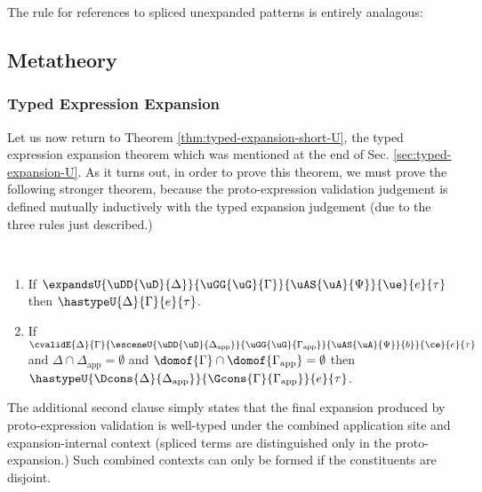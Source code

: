 \documentclass[acmsmall,10pt,review,anonymous]{acmart}\settopmatter{printfolios=true}
\begin{document}
The rule for references to spliced unexpanded patterns is entirely analagous:
\begin{mathpar}
\end{mathpar}

\subsection{Metatheory}\label{sec:s-metatheory}
\subsubsection{Typed Expression Expansion} Let us now return to Theorem \ref{thm:typed-expansion-short-U}, the typed expression expansion theorem which was mentioned at the end of Sec. \ref{sec:typed-expansion-U}. As it turns out, in order to prove this theorem, we must  prove the following stronger theorem, because the proto-expression validation judgement is defined mutually inductively with the typed expansion judgement (due to the three rules just described.)

\begin{theorem} ~
\begin{enumerate}[nolistsep]
\item If $\expandsU{\uDD{\uD}{\Delta}}{\uGG{\uG}{\Gamma}}{\uAS{\uA}{\Psi}}{\ue}{e}{\tau}$ then $\hastypeU{\Delta}{\Gamma}{e}{\tau}$.
\item If $\cvalidE{\Delta}{\Gamma}{\esceneU{\uDD{\uD}{\Delta_\text{app}}}{\uGG{\uG}{\Gamma_\text{app}}}{\uAS{\uA}{\Psi}}{b}}{\ce}{e}{\tau}$ and $\Delta \cap \Delta_\text{app} = \emptyset$ and $\domof{\Gamma} \cap \domof{\Gamma_\text{app}} = \emptyset$ then $\hastypeU{\Dcons{\Delta}{\Delta_\text{app}}}{\Gcons{\Gamma}{\Gamma_\text{app}}}{e}{\tau}$.
\end{enumerate}
\end{theorem}
The additional second clause simply states that the final expansion produced by proto-expression validation is well-typed under the combined application site and expansion-internal context (spliced terms are distinguished only in the proto-expansion.) Such combined contexts can only be formed if the constituents are disjoint.
\end{document}
